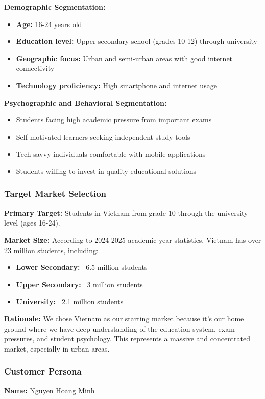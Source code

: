 \textbf{Demographic Segmentation:}
\begin{itemize}
    \item \textbf{Age:} 16-24 years old
    \item \textbf{Education level:} Upper secondary school (grades 10-12) through university
    \item \textbf{Geographic focus:} Urban and semi-urban areas with good internet connectivity
    \item \textbf{Technology proficiency:} High smartphone and internet usage
\end{itemize}

\textbf{Psychographic and Behavioral Segmentation:}
\begin{itemize}
    \item Students facing high academic pressure from important exams
    \item Self-motivated learners seeking independent study tools
    \item Tech-savvy individuals comfortable with mobile applications
    \item Students willing to invest in quality educational solutions
\end{itemize}

\subsubsection{Target Market Selection}
\textbf{Primary Target:} Students in Vietnam from grade 10 through the university level (ages 16-24).

\textbf{Market Size:} According to 2024-2025 academic year statistics, Vietnam has over 23 million students, including:
\begin{itemize}
    \item \textbf{Lower Secondary:} ~6.5 million students
    \item \textbf{Upper Secondary:} ~3 million students
    \item \textbf{University:} ~2.1 million students
\end{itemize}

\textbf{Rationale:} We chose Vietnam as our starting market because it's our home ground where we have deep understanding of the education system, exam pressures, and student psychology. This represents a massive and concentrated market, especially in urban areas.

\subsubsection{Customer Persona}
\textbf{Name:} Nguyen Hoang Minh

